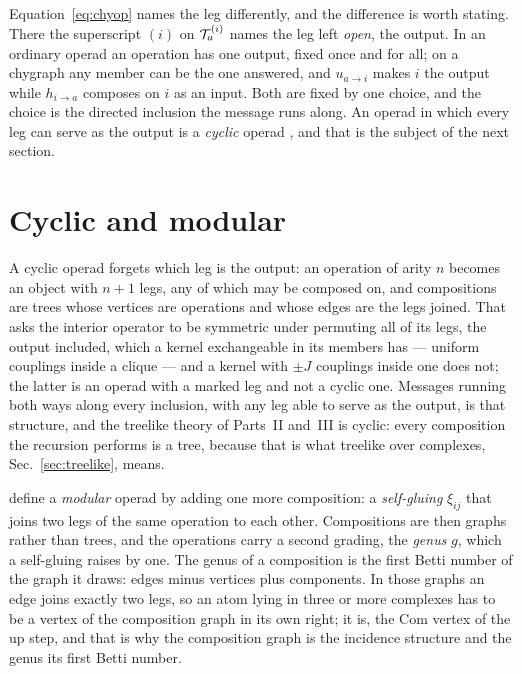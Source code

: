 Equation~\eqref{eq:chyop} names the leg differently, and the difference is
worth stating. There the superscript $(i)$ on $\mathcal{T}^{(i)}_{a}$ names the leg
left \emph{open}, the output. In an ordinary operad an operation has one
output, fixed once and for all; on a chygraph any member can be the one
answered, and $u_{a\to i}$ makes $i$ the output while $h_{i\to a}$ composes
on $i$ as an input. Both are fixed by one choice, and the choice is the
directed inclusion the message runs along. An operad in which every leg can
serve as the output is a \emph{cyclic} operad \citep{getzler1995}, and that
is the subject of the next section.

\section{Cyclic and modular}
\label{sec:op-modular}

A cyclic operad forgets which leg is the output: an operation of arity $n$
becomes an object with $n+1$ legs, any of which may be composed on, and
compositions are trees whose vertices are operations and whose edges are the
legs joined. That asks the interior operator to be symmetric under
permuting all of its legs, the output included, which a kernel
exchangeable in its members has --- uniform couplings inside a clique ---
and a kernel with $\pm J$ couplings inside one does not; the latter is an
operad with a marked leg and not a cyclic one. Messages running both ways along every inclusion, with any leg
able to serve as the output, is that structure, and the treelike theory of
Parts~II and~III is cyclic: every composition the recursion performs is a
tree, because that is what treelike over complexes, Sec.~\ref{sec:treelike},
means.

\citet{getzler1998} define a \emph{modular} operad by adding one more
composition: a \emph{self-gluing} $\xi_{ij}$ that joins two legs of the same
operation to each other. Compositions are then graphs rather than trees, and
the operations carry a second grading, the \emph{genus} $g$, which a
self-gluing raises by one. The genus of a composition is the first Betti
number of the graph it draws: edges minus vertices plus components. In
those graphs an edge joins exactly two legs, so an atom lying in three or
more complexes has to be a vertex of the composition graph in its own
right; it is, the $\mathrm{Com}$ vertex of the up step, and that is why
the composition graph is the incidence structure and the genus its first
Betti number.

